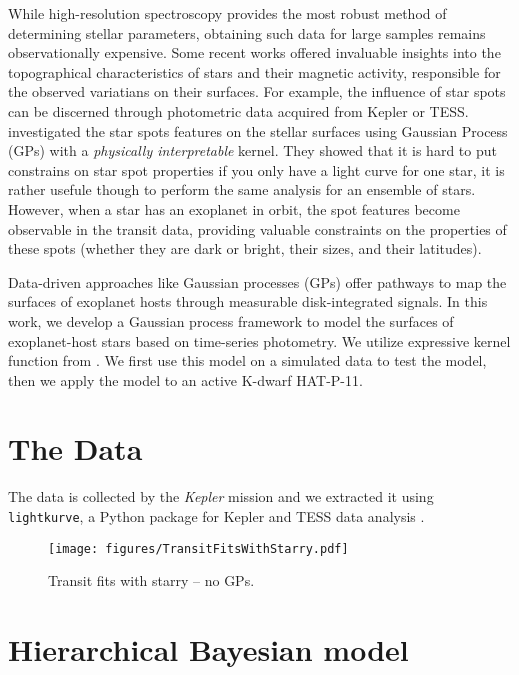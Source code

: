 \documentclass[twocolumn]{aastex631}
\begin{document}
While high-resolution spectroscopy provides the most robust method of determining stellar parameters, obtaining such data for large samples remains 
observationally expensive. Some recent works offered invaluable insights into the topographical characteristics of stars and their magnetic 
activity, responsible for the observed variatians on their surfaces. For example, the influence of star spots can be discerned through photometric 
data acquired from Kepler or TESS. \cite{Luger2021b} investigated the star spots features on the stellar surfaces using Gaussian Process (GPs) 
with a \emph{physically interpretable} kernel. They showed that it is hard to put constrains on star spot properties if you only have a light curve for 
one star, it is rather usefule though to perform the same analysis for an ensemble of stars. However, when a star has an exoplanet in orbit, 
the spot features become observable in the transit data, providing valuable constraints on the properties of these spots 
(whether they are dark or bright, their sizes, and their latitudes).

Data-driven approaches like Gaussian processes (GPs) offer pathways to map the surfaces of exoplanet hosts through measurable disk-integrated signals. 
In this work, we develop a Gaussian process framework to model the surfaces of exoplanet-host stars based on time-series photometry. We utilize 
expressive kernel function from \cite{Luger2021b}. We first use this model on a simulated data to test the model, then we apply the model to an active K-dwarf
HAT-P-11. 




%
\section{The Data}
The data is collected by the \emph{Kepler} mission and we extracted it using
\texttt{lightkurve}, a Python package for Kepler and TESS data analysis \citep{lightkurve}.
%
\begin{figure}[ht!]
    \begin{centering}
        \texttt{[image: figures/TransitFitsWithStarry.pdf]}
        \caption{
            Transit fits with starry -- no GPs.
        }
        \label{fig:TransitFitsStarry}
    \end{centering}
\end{figure}
%
\section{Hierarchical Bayesian model}
\end{document}
